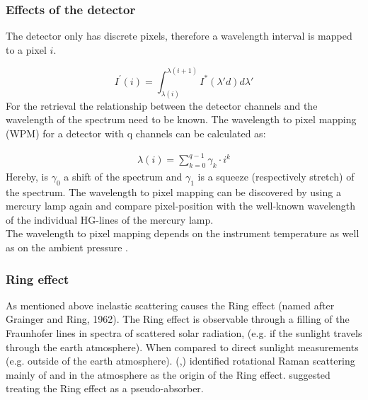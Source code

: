 \documentclass  [
  paper    = a4,
  BCOR     = 10mm,
  twoside,
  fontsize = 12pt,
  fleqn,
  toc      = bibnumbered,
  toc      = listofnumbered,
  numbers  = noendperiod,
  headings = normal,
  listof   = leveldown,
  version  = 3.03
]                                       {scrreprt}
\begin{document}
\subsubsection*{Effects of the detector}
The detector only has discrete pixels, therefore a wavelength interval is mapped to a pixel $i$.

\begin{equation}
I^{'}\left(i\right) = \int_{\lambda(i)}^{\lambda(i+1)}I^{*}\left(\lambda{'}d\right)d\lambda{'}
\end{equation}
For the retrieval the relationship between the detector channels and the wavelength of the spectrum need to be known.
The wavelength to pixel mapping (WPM) for a detector with q channels can be calculated as:

\begin{eqnarray}
\lambda(i) = \sum_{k=0}^{q-1}\gamma_{k}\cdot i^{k}
\end{eqnarray}
Hereby, is $\gamma_{0}$ a shift of the spectrum and $\gamma_{1}$ is a squeeze (respectively stretch) of the spectrum.
The wavelength to pixel mapping can be discovered by using a mercury lamp again and compare pixel-position with the well-known wavelength of the individual HG-lines of the mercury lamp.\\
The wavelength to pixel mapping depends on the instrument temperature as well as on the ambient pressure \citep{lubcke2014bro}.
\subsubsection*{Ring effect}
As mentioned above inelastic scattering causes the Ring effect (named after Grainger and Ring, 1962).
The Ring effect is observable through a filling of the Fraunhofer lines in spectra of scattered solar radiation, (e.g. if the sunlight travels through the earth atmosphere). When compared to direct sunlight measurements (e.g. outside of the earth atmosphere).
(\citet{bussemer1993ring},\citet{solomon1987interpretation}) identified rotational Raman scattering mainly of
 and  in the atmosphere as the origin of the Ring effect.
\citet{solomon1987interpretation} suggested treating the Ring effect as a pseudo-absorber. 

\end{document}
